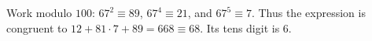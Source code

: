 Work modulo $100$: $67^2\equiv89$, $67^4\equiv21$, and $67^5\equiv7$. Thus the expression is congruent to $12+81\cdot7+89=668\equiv68$. Its tens digit is $\boxed6$.
